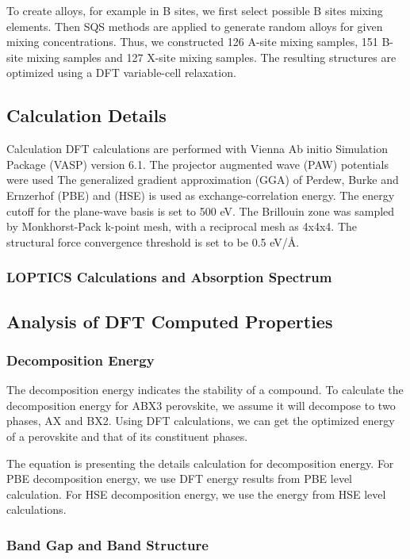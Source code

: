 \documentclass[twoside, twocolumn, 9pt, draft]{article}
\begin{document}
To create alloys, for example in B sites, we first select possible B
sites mixing elements.  Then SQS methods are applied to generate
random alloys for given mixing concentrations. Thus, we constructed
126 A-site mixing samples, 151 B-site mixing samples and 127 X-site
mixing samples. The resulting structures are optimized using a DFT
variable-cell relaxation.

\subsection*{Calculation Details}
\label{sec:orgc4131c4}
Calculation DFT calculations are performed with Vienna Ab initio
Simulation Package (VASP) version 6.1. The projector augmented wave
(PAW) potentials were used The generalized gradient approximation (GGA)
of Perdew, Burke and Ernzerhof (PBE) and (HSE) is used as
exchange-correlation energy. The energy cutoff for the plane-wave basis
is set to 500 eV. The Brillouin zone was sampled by Monkhorst-Pack
k-point mesh, with a reciprocal mesh as 4x4x4. The structural force
convergence threshold is set to be 0.5 eV/Å.

\subsubsection*{LOPTICS Calculations and Absorption Spectrum}
\label{sec:org25fda3f}

\subsection*{Analysis of DFT Computed Properties}
\label{sec:org0228c71}
\subsubsection*{Decomposition Energy}
\label{sec:org64e32fb}
The decomposition energy indicates the stability of a compound. To
calculate the decomposition energy for ABX3 perovskite, we assume it
will decompose to two phases, AX and BX2. Using DFT calculations, we
can get the optimized energy of a perovskite and that of its
constituent phases.

The equation is presenting the details calculation for decomposition
energy. For PBE decomposition energy, we use DFT energy results from
PBE level calculation. For HSE decomposition energy, we use the energy
from HSE level calculations.

\subsubsection*{Band Gap and Band Structure}
\label{sec:orga87f3df}
\end{document}
